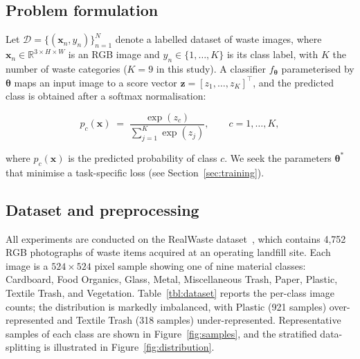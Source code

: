 \documentclass[a4paper,fleqn]{cas-dc}
\begin{document}
\subsection{Problem formulation}

Let $\mathcal{D}=\{(\mathbf{x}_n, y_n)\}_{n=1}^{N}$ denote a labelled dataset
of waste images, where $\mathbf{x}_n \in \mathbb{R}^{3\times H \times W}$ is
an RGB image and $y_n \in \{1,\dots,K\}$ is its class label, with $K$ the
number of waste categories ($K=9$ in this study). A classifier
$f_{\boldsymbol\theta}$ parameterised by $\boldsymbol\theta$ maps an input
image to a score vector $\mathbf{z}=\left[z_1,\dots,z_K\right]^\top$, and the
predicted class is obtained after a softmax normalisation:

\begin{equation}\label{eq:softmax}
  p_c(\mathbf{x}) \;=\; \frac{\exp\!\left(z_c\right)}
        {\sum_{j=1}^{K}\exp\!\left(z_j\right)},
\qquad c = 1,\dots,K,
\end{equation}

where $p_c(\mathbf{x})$ is the predicted probability of class $c$. We seek the
parameters $\boldsymbol\theta^*$ that minimise a task-specific loss (see
Section~\ref{sec:training}).

\subsection{Dataset and preprocessing}\label{sec:dataset}

All experiments are conducted on the RealWaste dataset~\cite{realwaste}, which
contains 4{,}752 RGB photographs of waste items acquired at an operating
landfill site. Each image is a $524\times524$ pixel sample showing one of nine
material classes: Cardboard, Food Organics, Glass, Metal, Miscellaneous Trash,
Paper, Plastic, Textile Trash, and Vegetation. Table~\ref{tbl:dataset} reports
the per-class image counts; the distribution is markedly imbalanced, with
Plastic (921 samples) over-represented and Textile Trash (318 samples)
under-represented. Representative samples of each class are shown in
Figure~\ref{fig:samples}, and the stratified data-splitting is illustrated in
Figure~\ref{fig:distribution}.
\end{document}
